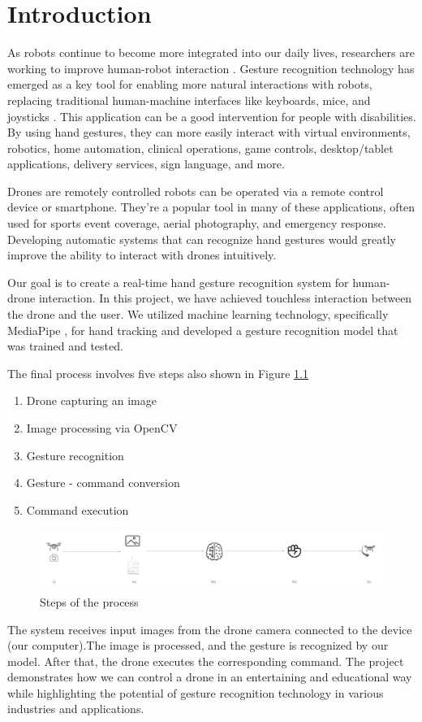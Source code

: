 \clearpage
\chapter{Introduction}
\label{ch:intro}

As robots continue to become more integrated into our daily lives, researchers are working to improve human-robot interaction \cite{premaratne2014human}. Gesture recognition technology has emerged as a key tool for enabling more natural interactions with robots, replacing traditional human-machine interfaces like keyboards, mice, and joysticks \cite{smith2022hand}. This application can be a good intervention for people with disabilities. By using hand gestures, they can more easily interact with virtual environments, robotics, home automation, clinical operations, game controls, desktop/tablet applications, delivery services, sign language, and more. 


Drones are remotely controlled robots can be operated via a remote control device or smartphone. They're a popular tool in many of these applications, often used for sports event coverage, aerial photography, and emergency response. Developing automatic systems that can recognize hand gestures would greatly improve the ability to interact with drones intuitively.

 Our goal is to create a real-time hand gesture recognition system for human-drone interaction. In this project, we have achieved touchless interaction between the drone and the user. We utilized machine learning technology, specifically MediaPipe \cite{mediapipe2023source}, for hand tracking and developed a gesture recognition model that was trained and tested. 
 
 The final process involves five steps also shown in Figure \ref{fig:conclusion} 

\begin{enumerate}[label=\Roman*.]
	\item Drone capturing an image
	\item Image processing via OpenCV
	\item Gesture recognition
	\item Gesture - command conversion
	\item Command execution
\end{enumerate}


\begin{figure}[h!]
	\centering
	\includegraphics[width = \textwidth]{images/steps.pdf}
	\caption{Steps of the process}
	\label{fig:conclusion}
\end{figure}


 The system receives input images from the drone camera connected to the device (our computer).The image is processed, and the gesture is recognized by our model. After that, the drone executes the corresponding command. 
 The project demonstrates how we can control a drone in an entertaining and educational way while highlighting the potential of gesture recognition technology in various industries and applications.
